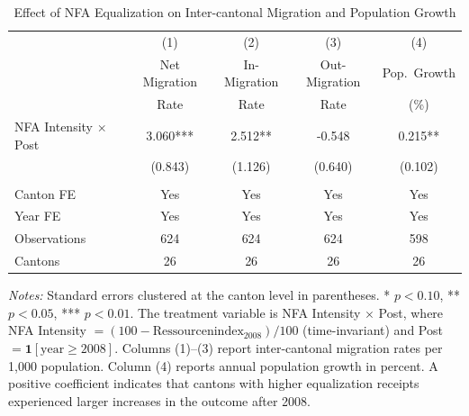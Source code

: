\begin{table}[H]
\centering
\caption{Effect of NFA Equalization on Inter-cantonal Migration and Population Growth}
\begin{threeparttable}
\begin{tabular}{lcccc}
\toprule
 & (1) & (2) & (3) & (4) \\
 & Net Migration & In-Migration & Out-Migration & Pop.~Growth \\
 & Rate & Rate & Rate & (\%) \\
\midrule
NFA Intensity $\times$ Post & 3.060*** & 2.512** & -0.548 & 0.215** \\
 & (0.843) & (1.126) & (0.640) & (0.102) \\
 \\
Canton FE & Yes & Yes & Yes & Yes \\
Year FE & Yes & Yes & Yes & Yes \\
Observations & 624 & 624 & 624 & 598 \\
Cantons & 26 & 26 & 26 & 26 \\
\bottomrule
\end{tabular}
\begin{tablenotes}[flushleft]
\small
\item \textit{Notes:} Standard errors clustered at the canton level in parentheses. * $p<0.10$, ** $p<0.05$, *** $p<0.01$. The treatment variable is NFA Intensity $\times$ Post, where NFA Intensity $= (100 - \text{Ressourcenindex}_{2008})/100$ (time-invariant) and Post $= \mathbf{1}[\text{year} \geq 2008]$. Columns (1)--(3) report inter-cantonal migration rates per 1,000 population. Column (4) reports annual population growth in percent. A positive coefficient indicates that cantons with higher equalization receipts experienced larger increases in the outcome after 2008.
\end{tablenotes}
\end{threeparttable}
\label{tab:main}
\end{table}

